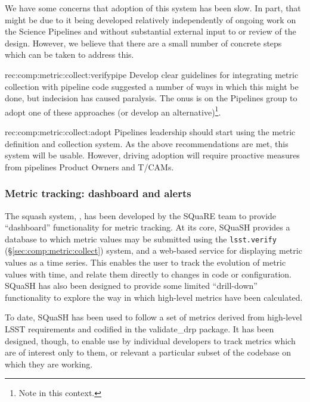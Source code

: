 We have some concerns that adoption of this system has been slow.
In part, that might be due to it being developed relatively independently of ongoing work on the Science Pipelines and without substantial external input to or review of the design.
However, we believe that there are a small number of concrete steps which can be taken to address this.

\begin{recommendation}
    {rec:comp:metric:collect:verifypipe}
    {Develop clear guidelines for integrating metric collection with pipeline code}
     suggested a number of ways in which this might be done, but indecision has caused paralysis.
    The onus is on the Pipelines group to adopt one of these approaches (or develop an alternative)\footnote{Note  in this context.}.
\end{recommendation}

\begin{recommendation}
    {rec:comp:metric:collect:adopt}
    {Pipelines leadership should start using the metric definition and collection system.}
    As the above recommendations are met, this system will be usable.
    However, driving adoption will require proactive measures from pipelines Product Owners and T/CAMs.
\end{recommendation}

\subsubsection{Metric tracking: dashboard and alerts}
\label{sec:comp:metric:dashboard}

The \gls{squash} system, , has been developed by the SQuaRE team to provide ``\gls{dashboard}'' functionality for metric tracking.
At its core, SQuaSH provides a database to which metric values may be submitted using the \texttt{lsst.verify} (\S\ref{sec:comp:metric:collect}) system, and a web-based service for displaying metric values as a time series.
This enables the user to track the evolution of metric values with time, and relate them directly to changes in code or configuration.
SQuaSH has also been designed to provide some limited ``drill-down'' functionality to explore the way in which high-level metrics have been calculated.

To date, SQuaSH has been used to follow a set of metrics derived from high-level LSST requirements and codified in the validate\_drp package.
It has been designed, though, to enable use by individual developers to track metrics which are of interest only to them, or relevant a particular subset of the codebase on which they are working.


